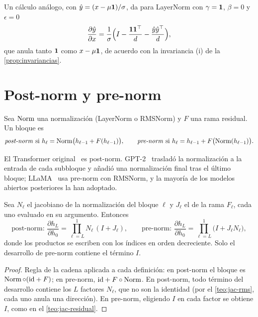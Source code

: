 \begin{observacion}
Un cálculo análogo, con $\hat y=(x-\mu\mathbf{1})/\sigma$, da para LayerNorm con $\gamma=\mathbf{1}$, $\beta=0$ y $\epsilon=0$
\[
\frac{\partial\hat y}{\partial x}=\frac1\sigma\Bigl(I-\frac{\mathbf{1}\mathbf{1}^{\top}}{d}-\frac{\hat y\hat y^{\top}}{d}\Bigr),
\]
que anula tanto $\mathbf{1}$ como $x-\mu\mathbf{1}$, de acuerdo con la invariancia (i) de la \cref{prop:invariancias}.
\end{observacion}

\section{Post-norm y pre-norm}

\begin{definicion}\label{def:pre-post}
Sea $\operatorname{Norm}$ una normalización (LayerNorm o RMSNorm) y $F$ una rama residual. Un bloque es
\[
\text{\emph{post-norm} si } h_\ell=\operatorname{Norm}\bigl(h_{\ell-1}+F(h_{\ell-1})\bigr),\qquad
\text{\emph{pre-norm} si } h_\ell=h_{\ell-1}+F\bigl(\operatorname{Norm}(h_{\ell-1})\bigr).
\]
\end{definicion}

El Transformer original~\cite{vaswani} es post-norm. GPT-2~\cite[§2.3]{gpt2} trasladó la normalización a la entrada de cada subbloque y añadió una normalización final tras el último bloque; LLaMA~\cite{llama} usa pre-norm con RMSNorm, y la mayoría de los modelos abiertos posteriores la han adoptado.

\begin{proposicion}\label{prop:jac-pre-post}
Sea $N_\ell$ el jacobiano de la normalización del bloque $\ell$ y $J_\ell$ el de la rama $F_\ell$, cada uno evaluado en su argumento. Entonces
\[
\text{post-norm: }\frac{\partial h_L}{\partial h_0}=\prod_{\ell=L}^{1}N_\ell\,(I+J_\ell),\qquad
\text{pre-norm: }\frac{\partial h_L}{\partial h_0}=\prod_{\ell=L}^{1}\bigl(I+J_\ell N_\ell\bigr),
\]
donde los productos se escriben con los índices en orden decreciente. Solo el desarrollo de pre-norm contiene el término $I$.
\end{proposicion}

\begin{proof}
Regla de la cadena aplicada a cada definición: en post-norm el bloque es $\operatorname{Norm}\circ(\mathrm{id}+F)$; en pre-norm, $\mathrm{id}+F\circ\operatorname{Norm}$. En post-norm, todo término del desarrollo contiene los $L$ factores $N_\ell$, que no son la identidad (por el \cref{teo:jac-rms}, cada uno anula una dirección). En pre-norm, eligiendo $I$ en cada factor se obtiene $I$, como en el \cref{teo:jac-residual}.
\end{proof}


